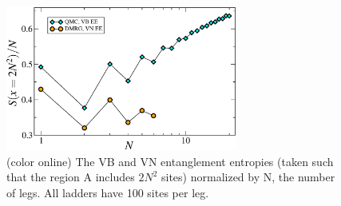 \documentclass[prl,aps,twocolumn,floatfix,amsmath,amssymb,superscriptaddress,tightenlines]{revtex4}
\begin{document}
\begin{figure}
{
\includegraphics[width=3in]{fig4.eps}
\caption{(color online) The VB and VN entanglement entropies (taken such that the region A includes $2N^2$ sites) normalized by N, the number of legs.  All ladders have 100 sites per leg.
\label{zigzag}}}
\end{figure}


\end{document}
